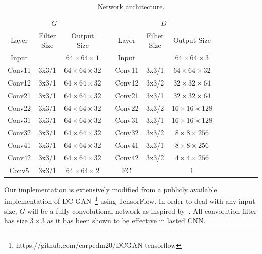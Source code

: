 \documentclass[10pt,twocolumn,letterpaper]{article}
\begin{document}
\begin{table}[t!]
\caption{\small Network architecture.}
\label{tab:network}
\begin{center}
\small
\begin{tabular}{ @{}ccccccccccccc@{} }
\toprule
\multicolumn{3}{c}{$G$} & \hspace{2mm} 
& \multicolumn{3}{c}{$D$} \\
\cmidrule(r){1-3}
\cmidrule(r){5-7}

Layer & Filter Size & Output Size && Layer & Filter Size & Output Size \\ \midrule
Input  &       & $64\times64\times1$  && Input  &       & $64\times64\times3$ \\ \midrule
Conv11 & 3x3/1 & $64\times64\times32$ && Conv11& 3x3/1 & $64\times64\times32$ \\
Conv12 & 3x3/1 & $64\times64\times32$ && Conv12& 3x3/2 & $32\times32\times64$ \\ \midrule

Conv21 & 3x3/1 & $64\times64\times32$ && Conv21& 3x3/1 & $32\times32\times64$ \\
Conv22 & 3x3/1 & $64\times64\times32$ && Conv22& 3x3/2 & $16\times16\times128$ \\ \midrule

Conv31 & 3x3/1 & $64\times64\times32$ && Conv31& 3x3/1 & $16\times16\times128$ \\
Conv32 & 3x3/1 & $64\times64\times32$ && Conv32& 3x3/2 & $8\times8\times256$ \\   \midrule

Conv41 & 3x3/1 & $64\times64\times32$ && Conv41& 3x3/1 & $8\times8\times256$ \\
Conv42 & 3x3/1 & $64\times64\times32$ && Conv42& 3x3/2 & $4\times4\times256$ \\  \midrule

Conv5  & 3x3/1 & $64\times64\times2$  && FC     &       & $1$ \\ \bottomrule
\end{tabular}%
\end{center}
\end{table}

Our implementation is extensively modified from a publicly available implementation of DC-GAN~\footnote{https://github.com/carpedm20/DCGAN-tensorflow} using TensorFlow. In order to deal with any input size, $G$ will be a fully convolutional network as inspired by~\cite{long2015fully}. All convolution filter has size $3 \times 3$ as it has been shown to be effective in lasted CNN. 
\end{document}
